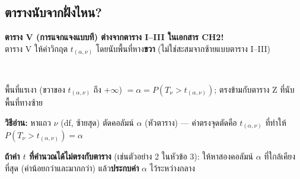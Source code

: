 \documentclass[9pt]{extarticle}
\begin{document}
\subsection*{\textcolor{ideafr}{ตารางนับจากฝั่งไหน?}}
\begin{center}
\begin{minipage}{9cm}
\centering
\textbf{ตาราง V (การแจกแจงแบบที) ต่างจากตาราง I--III ในเอกสาร CH2!}\\
ตาราง V ให้ค่าวิกฤต $t_{(\alpha,\nu)}$ โดยนับพื้นที่หาง\textbf{ขวา} (ไม่ใช่สะสมจากซ้ายแบบตาราง I--III)
\\
{\footnotesize พื้นที่แรเงา (ขวาของ $t_{(\alpha,\nu)}$ ถึง $+\infty$) $=\alpha=P(T_\nu{>}t_{(\alpha,\nu)})$; ตรงข้ามกับตาราง Z ที่นับพื้นที่ทางซ้าย\par}
\end{minipage}
\end{center}

\textbf{วิธีอ่าน:} หาแถว $\nu$ (df, ซ้ายสุด) ตัดคอลัมน์ $\alpha$ (หัวตาราง) — ค่าตรงจุดตัดคือ $t_{(\alpha,\nu)}$ ที่ทำให้ $P(T_\nu>t_{(\alpha,\nu)})=\alpha$

\textbf{ถ้าค่า $t$ ที่คำนวณได้ไม่ตรงกับตาราง} (เช่นตัวอย่าง 2 ในหัวข้อ 3): ให้หาสองคอลัมน์ $\alpha$ ที่ใกล้เคียงที่สุด (ค่าน้อยกว่าและมากกว่า) แล้ว\textbf{ประกบค่า} $\alpha$ ไว้ระหว่างกลาง
\end{document}
